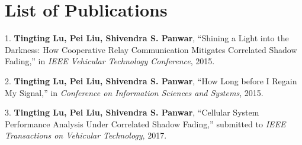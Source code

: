 \chapter*{List of Publications}

1. \textbf{Tingting Lu, Pei Liu, Shivendra S. Panwar}, ``Shining a Light into the Darkness: How Cooperative Relay Communication Mitigates Correlated Shadow Fading,''  in \emph{IEEE Vehicular Technology Conference}, 2015.

2. \textbf{Tingting Lu, Pei Liu, Shivendra S. Panwar}, ``How Long before I Regain My Signal,''  in \emph{Conference on Information Sciences and Systems}, 2015.

3. \textbf{Tingting Lu, Pei Liu, Shivendra S. Panwar}, ``Cellular System Performance Analysis Under Correlated Shadow Fading,''  submitted to \emph{IEEE Transactions on Vehicular Technology}, 2017.
